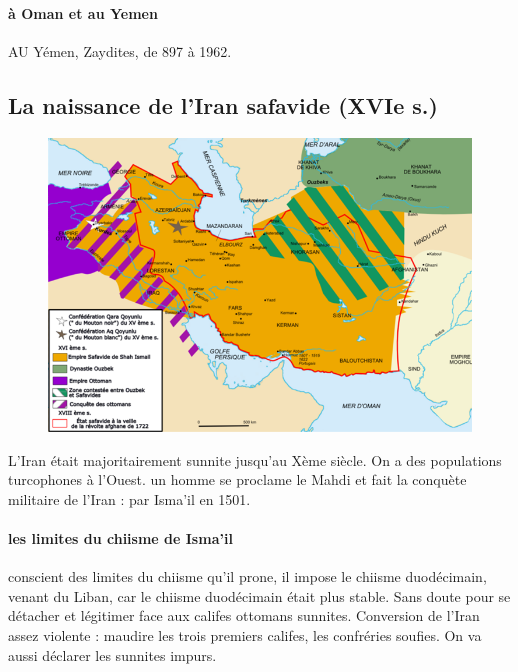  \paragraph{à Oman et au Yemen} AU Yémen, Zaydites, de 897 à 1962.
 
 
 
  \subsection{La naissance de l'Iran safavide (XVIe s.)}
 
  \begin{figure}
     \centering
 
\includegraphics[width=\textwidth]{CourantsIslamContemporain/ImagesCourantsIslamContemporain/image2Chiisme.png}

     \label{fig:my_label}
 \end{figure}
 L'Iran était majoritairement sunnite jusqu'au Xème siècle. On a des populations turcophones à l'Ouest. un homme se proclame le Mahdi et fait la conquète militaire de l'Iran : par Isma'il en 1501.
  
 \paragraph{les limites du chiisme de Isma'il} conscient des limites du chiisme qu'il prone, il impose le chiisme duodécimain, venant du Liban, car le chiisme duodécimain était plus stable. Sans doute pour se détacher et légitimer face aux califes ottomans sunnites. Conversion de l'Iran assez violente : maudire les trois premiers califes, les confréries soufies. On va aussi déclarer les sunnites impurs.  


